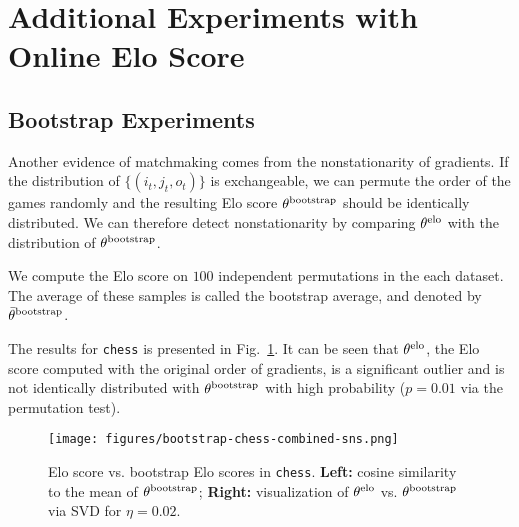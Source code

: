 \section{Additional Experiments with Online Elo Score}
\label{sec:appendix-addition}

\subsection{Bootstrap Experiments}
\label{sec:appendix-bootstrap}
Another evidence of matchmaking comes from the nonstationarity of gradients. If the distribution of $\{(i_t,j_t,o_t)\}$ is exchangeable, we can permute the order of the games randomly and the resulting Elo score $\theta^{\rm bootstrap}$ should be identically distributed. We can therefore detect nonstationarity by comparing $\theta^{\rm elo}$ with the distribution of $\theta^{\rm bootstrap}$. 

We compute the Elo score on $100$ independent permutations in the each dataset. The average of these samples is called the bootstrap average, and denoted by $\bar{\theta}^{\rm bootstrap}$.

The results for \texttt{chess} is presented in Fig.~\ref{fig:chess-bootstrap}. It can be seen that $\theta^{\rm elo}$, the Elo score computed with the original order of gradients, is a significant outlier and is not identically distributed with $\theta^{\rm bootstrap}$ with high probability ($p=0.01$ via the permutation test).

\begin{figure}[h]
    \centering
    \texttt{[image: figures/bootstrap-chess-combined-sns.png]}
    \caption{Elo score vs. bootstrap Elo scores in \texttt{chess}. \textbf{Left:} cosine similarity to the mean of $\theta^{\rm bootstrap}$; \textbf{Right:} visualization of $\theta^{\rm elo}$ vs. $\theta^{\rm bootstrap}$ via SVD for $\eta=0.02$.}
    \label{fig:chess-bootstrap}
\end{figure}

